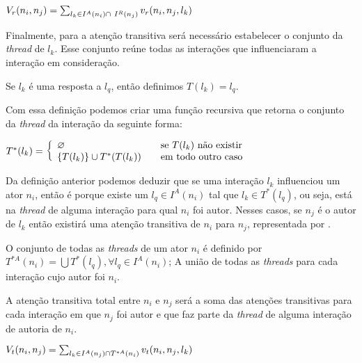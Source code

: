 \begin{Def}
$V_r(n_i, n_j) = \sum_{l_k \in I^A(n_i)\cap~I^R(n_j)}v_r(n_i, n_j, l_k)$
\end{Def}

Finalmente, para a atenção transitiva será necessário estabelecer o conjunto da
\emph{thread} de $l_k$. Esse conjunto reúne todas as interações que influenciaram
a interação em consideração. 

\begin{Def}
Se $l_k$ é uma resposta a $l_q$, então definimos $T(l_k) = l_q$.
\end{Def}

Com essa definição podemos criar uma função recursiva que retorna o conjunto
da \emph{thread} da interação da seguinte forma:

\begin{Def}
$T^*(l_k) = \left\{ \begin{array}{l l} \varnothing &\quad\text{se
$T(l_k)$ não existir}\\ \{T(l_k)\} \cup T^*(T(l_k)) &\quad\text{em
todo outro caso}\end{array} \right.$
\end{Def}

Da definição anterior podemos deduzir que se uma interação $l_k$ influenciou um
ator $n_i$, então é porque existe um $l_q \in I^A(n_i)$ tal que $l_k \in
T^*(l_q)$, ou seja, está na \emph{thread} de alguma interação para qual $n_i$
foi autor. Nesses casos, se $n_j$ é o autor de $l_k$ então existirá uma atenção
transitiva de $n_i$ para $n_j$, representada por . 

\begin{Def}
O conjunto de todas as \emph{threads} de um ator $n_i$ é definido por
$T^{*A}(n_i) = \bigcup T^*(l_q), \forall l_q \in I^A(n_i)$; A união de todas as
\emph{threads} para cada interação cujo autor foi $n_i$.
\end{Def}

A atenção transitiva total entre $n_i$ e $n_j$ será a soma das atenções
transitivas para cada interação em que $n_j$ foi autor e que faz parte da
\emph{thread} de alguma interação de autoria de $n_i$.

\begin{Def}
$V_t(n_i, n_j) = \sum_{l_k \in I^A(n_j)\cap T^{*A}(n_i)} v_t(n_i, n_j, l_k)$
\end{Def}
